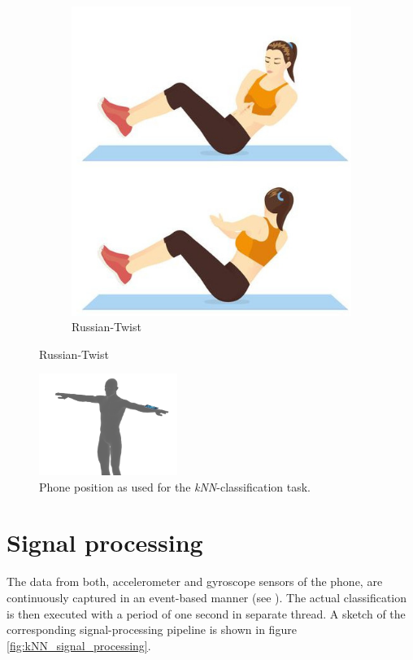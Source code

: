 \documentclass[journal]{IEEEtran}
\begin{document}
\begin{figure}[H]
\begin{minipage}[t][3.5cm][b]{0.11\textwidth}
\begin{figure}[H]
            \includegraphics[width=\textwidth]{figures/russian-twist.jpg}
            \caption{Russian-Twist \cite{noauthor_notitle_2021-2}}
            \label{ref:fig_kNN_activity_4}
        \end{figure}
    \end{minipage}
\end{figure}
\begin{figure}[htbp]
    \centering
    \includegraphics[width=0.4\textwidth]{figures/kNN_position.png}
    \caption{Phone position as used for the \textit{kNN}-classification task.}
    \label{fig:knn_position}
\end{figure}

\section{Signal processing}
The data from both, accelerometer and gyroscope sensors of the phone, 
are continuously captured in an
event-based manner (see \cite{noauthor_sensoreventcallback_2021}). The actual
classification is then executed with a period of one second in separate thread. 
A sketch of the corresponding signal-processing pipeline is shown in figure
\ref{fig:kNN_signal_processing}.
\end{document}
